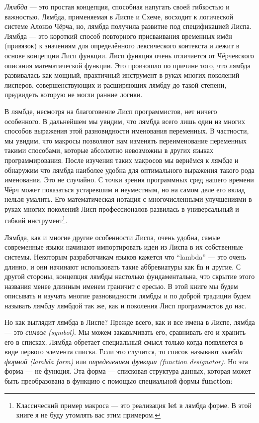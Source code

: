 \emph{Лямбда} --- это простая концепция, способная напугать своей гибкостью и важностью. Лямбда, применяемая в Лиспе и Схеме, восходит к логической системе Алонзо Чёрча, но, лямбда получила развитие под спецификацией Лиспа. Лямбда --- это короткий способ повторного присваивания временных имён (привязок) к значениям для определённого лексического контекста и лежит в основе концепции Лисп функции. Лисп функция очень отличается от Чёрчевского описания математической функции. Это произошло по причине того, что лямбда развивалась как мощный, практичный инструмент в руках многих поколений лисперов, совершенствующих и расширяющих лямбду до такой степени, предвидеть которую не могли ранние логики.

В лямбде, несмотря на благоговение Лисп программистов, нет ничего особенного. В дальнейшем мы увидим, что лямбда всего лишь один из многих способов выражения этой разновидности именования переменных. В частности, мы увидим, что макросы позволяют нам изменять переименование переменных такими способами, которые абсолютно невозможны в других языках программирования. После изучения таких макросов мы вернёмся к лямбде и обнаружим что лямбда наиболее удобна для оптимального выражения такого рода именования. Это не случайно. С точки зрения программных сред нашего времени Чёрч может показаться устаревшим и неуместным, но на самом деле его вклад нельзя умалить. Его математическая нотация с многочисленными улучшениями в руках многих поколений Лисп профессионалов развилась в универсальный и гибкий инструмент\footnote{Классический пример макроса --- это реализация \textbf{let} в лямбда форме. В этой книге я не буду утомлять вас этим примером.}.

Лямбда, как и многие другие особенности Лиспа, очень удобна, самые современные языки начинают импортировать идеи из Лиспа в их собственные системы. Некоторым разработчикам языков кажется что ``lambda'' --- это очень длинно, и они начинают использовать такие аббревиатуры как \textbf{fn} и другие. С другой стороны, концепция лямбды настолько фундаментальна, что скрытие этого названия менее длинным именем граничит с ересью. В этой книге мы будем описывать и изучать многие разновидности лямбды и по доброй традиции будем называть лямбду лямбдой так же, как и поколения Лисп программистов до нас.

Но как выглядит лямбда в Лиспе? Прежде всего, как и все имена в Лиспе, лямбда --- это \emph{символ (symbol)}. Мы можем закавычивать его, сравнивать его и хранить его в списках. Лямбда обретает специальный смысл только когда появляется в виде первого элемента списка. Если это случится, то список называют \emph{лямбда формой (lambda form)} или \emph{определением функции (function designator)}. Но эта форма --- не функция. Эта форма --- списковая структура данных, которая может быть преобразована в функцию с помощью специальной формы \textbf{function}:

